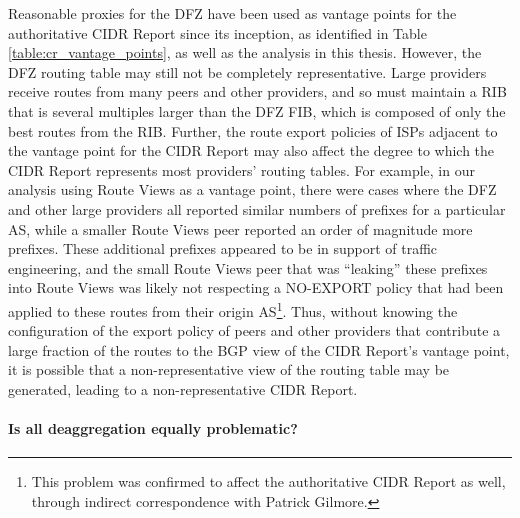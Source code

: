 Reasonable proxies for the DFZ have been used as vantage points for the
authoritative CIDR Report since its inception, as identified in Table
\ref{table:cr_vantage_points}, as well as the analysis in this thesis.
However, the DFZ routing table may still not be completely representative.
Large providers receive routes from many peers and other providers, and so must
maintain a RIB that is several multiples larger than the DFZ FIB, which is
composed of only the best routes from the RIB.  Further, the route export
policies of ISPs adjacent to the vantage point for the CIDR Report may also
affect the degree to which the CIDR Report represents most providers' routing
tables. For example, in our analysis using Route Views as a vantage point,
there were cases where the DFZ and other large providers all reported similar
numbers of prefixes for a particular AS, while a smaller Route Views peer
reported an order of magnitude more prefixes. These additional prefixes
appeared to be in support of traffic engineering, and the small Route Views
peer that was ``leaking'' these prefixes into Route Views was likely not
respecting a NO-EXPORT policy that had been applied to these routes from their
origin AS\footnote{This problem was confirmed to affect the authoritative CIDR
Report as well, through indirect correspondence with Patrick Gilmore.}. Thus,
without knowing the configuration of the export policy of peers and other
providers that contribute a large fraction of the routes to the BGP view of the
CIDR Report's vantage point, it is possible that a non-representative view of
the routing table may be generated, leading to a non-representative CIDR
Report.

%

\paragraph{Is all deaggregation equally problematic?}

